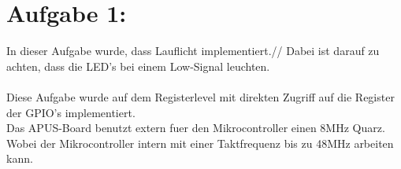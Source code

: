 \documentclass{report}
\newcommand{\name}{Marco Söllinger}
\newcommand{\matnr}{s2410306011}
\begin{document}


\section{Aufgabe 1:}
In dieser Aufgabe wurde, dass Lauflicht implementiert.//
Dabei ist darauf zu achten, dass die LED's bei einem Low-Signal leuchten.\\\\
Diese Aufgabe wurde auf dem Registerlevel mit direkten Zugriff auf die Register der GPIO's implementiert.\\
Das APUS-Board benutzt extern fuer den Mikrocontroller einen 8MHz Quarz.\\
Wobei der Mikrocontroller intern mit einer Taktfrequenz bis zu 48MHz arbeiten kann.\\\\


\end{document}
